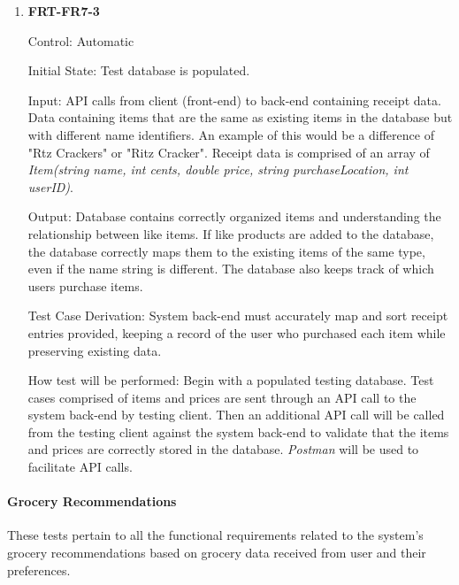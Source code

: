 \documentclass[12pt, titlepage]{article}
\begin{document}
\begin{enumerate}
\item{\textbf{FRT-FR7-3}}

Control: Automatic
          
Initial State: Test database is populated.

Input: API calls from client (front-end) to back-end containing receipt data. Data containing items that are the same as existing items in the database but with different name identifiers.
An example of this would be a difference of "Rtz Crackers" or "Ritz Cracker". Receipt data is comprised of an array of \textit{Item(string name, int cents, double price, string purchaseLocation, int userID)}.
          
Output: Database contains correctly organized items and understanding the relationship between like items. If like products are added to the database, the database correctly maps them to the existing items of the same type, even if the name string is different. The database also keeps track of which users purchase items.

Test Case Derivation: System back-end must accurately map and sort receipt entries provided, keeping a record of the user who purchased each item while preserving existing data.
          
How test will be performed: Begin with a populated testing database. Test cases comprised of items and prices are sent through an API call to the system back-end by testing client. Then an additional API call will be called from the testing client against the system back-end to validate that the items and prices are correctly stored in the database. \textit{Postman} will be used to facilitate API calls. 

\end{enumerate}

\paragraph{Grocery Recommendations}

These tests pertain to all the functional requirements related to the system's grocery recommendations based on grocery data received from user and their preferences.
\end{document}
